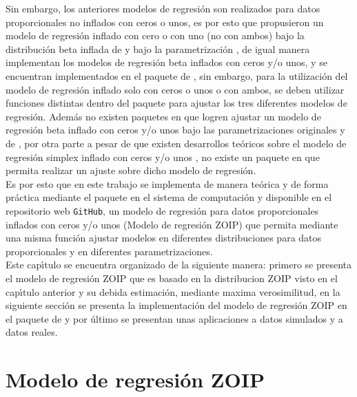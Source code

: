 Sin embargo, los anteriores modelos de regresi\'{o}n son realizados para datos proporcionales no inflados con ceros o unos, es por esto que \cite{Ospina1} propusieron un modelo de regresi\'{o}n inflado con cero o con uno (no con ambos) bajo la distribuci\'{o}n beta inflada de \cite{Ospina2} y bajo la parametrizaci\'{o}n \cite{Ferrari2}, de igual manera \cite{Stasinopoulos2} implementan los modelos de regresi\'{o}n beta inflados con ceros y/o unos, y se encuentran implementados en el paquete  de  \citep{Stasinopoulos1}, sin embargo, para la utilizaci\'{o}n del modelo de regresi\'{o}n inflado solo con ceros o unos o con ambos, se deben utilizar funciones distintas dentro del paquete para ajustar los tres diferentes modelos de regresi\'{o}n. Adem\'{a}s no existen paquetes en  que logren ajustar un modelo de regresi\'{o}n beta inflado con ceros y/o unos bajo las parametrizaciones originales y de \cite{Ferrari2}, por otra parte a pesar de que existen desarrollos te\'{o}ricos sobre el modelo de regresi\'{o}n simplex inflado con ceros y/o unos \citep{Galvis1}, no existe un paquete en  que permita realizar un ajuste sobre dicho modelo de regresi\'{o}n.\\

Es por esto que en este trabajo se implementa de manera te\'{o}rica y de forma pr\'{a}ctica mediante el paquete  en el sistema de computaci\'{o}n  \citep{R} y disponible en el repositorio web \verb|GitHub|, un modelo de regresi\'{o}n para datos proporcionales inflados con ceros y/o unos (Modelo de regresi\'{o}n ZOIP) que permita mediante una misma funci\'{o}n ajustar mo\-de\-los en diferentes distribuciones para datos proporcionales y en diferentes parametrizaciones.\\

Este cap\'{\i}tulo se encuentra organizado de la siguiente manera: primero se presenta el modelo de regresi\'{o}n ZOIP que es basado en la distribucion ZOIP visto en el cap\'{\i}tulo anterior y su debida estimaci\'{o}n, mediante maxima verosimilitud, en la siguiente secci\'{o}n se presenta la implementaci\'{o}n del modelo de regresi\'{o}n ZOIP en el paquete  de  y por \'{u}ltimo se presentan unas aplicaciones a datos simulados y a datos reales.



\section{Modelo de regresi\'{o}n ZOIP}

